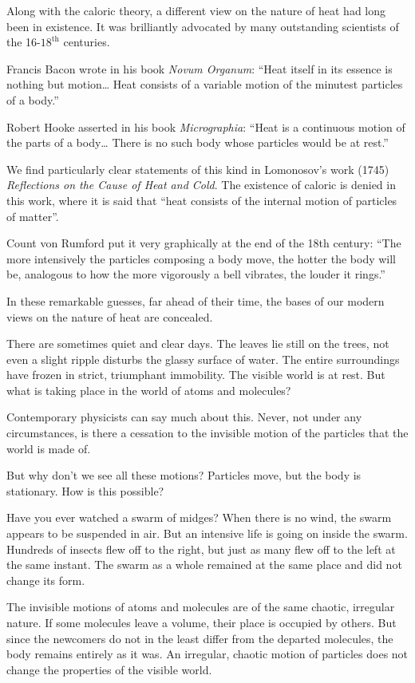 Along with the caloric theory, a different view on the nature of heat had long been in existence. It was brilliantly advocated by many outstanding scientists of the 16-$18^{\textrm{th}}$ centuries.

Francis Bacon wrote in his book \emph{Novum Organum}: ``Heat itself in its essence is nothing but motion\ldots{} Heat consists of a variable motion of the minutest particles of a body.''

Robert Hooke asserted in his book \emph{Micrographia}: ``Heat is a continuous motion of the parts of a body\ldots{} There is no such body whose particles would be at rest.''

We find particularly clear statements of this kind in Lomonosov’s work (1745) \emph{Reflections on the Cause of Heat and Cold}. The existence of caloric is denied in this work, where it is said that ``heat consists of the internal motion of particles of matter''.

Count von Rumford put it very graphically at the end of the 18th century: ``The more intensively the particles composing a body move, the hotter the body will be, analogous to how the more vigorously a bell vibrates, the louder it rings.''

In these remarkable guesses, far ahead of their time, the bases of our modern views on the nature of heat are concealed.

There are sometimes quiet and clear days. The leaves lie still on the trees, not even a slight ripple disturbs the glassy surface of water. The entire surroundings have frozen in strict, triumphant immobility. The visible world is at rest. But what is taking place in the world of atoms and molecules?

Contemporary physicists can say much about this. Never, not under any circumstances, is there a cessation to the invisible motion of the particles that the world is made of.

But why don’t we see all these motions? Particles move, but the body is stationary. How is this possible? 

Have you ever watched a swarm of midges? When there is no wind, the swarm appears to be suspended in air. But an intensive life is going on inside the swarm. Hundreds of insects flew off to the right, but just as many flew off to the left at the same instant. The swarm as a whole remained at the same place and did not change its form.

The invisible motions of atoms and molecules are of the same chaotic, irregular nature. If some molecules leave a volume, their place is occupied by others. But since the newcomers do not in the least differ from the departed molecules, the body remains entirely as it was. An irregular, chaotic motion of particles does not change the properties of the visible world.

